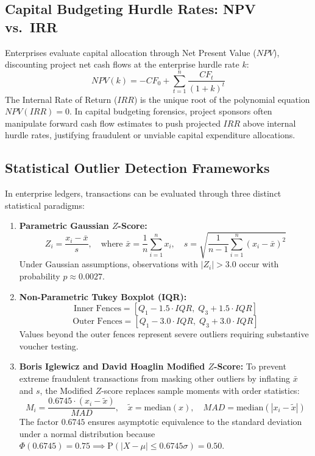 \subsection{Capital Budgeting Hurdle Rates: NPV vs.~IRR}
Enterprises evaluate capital allocation through Net Present Value ($NPV$), discounting project net cash flows at the enterprise hurdle rate $k$:
\begin{equation}
NPV(k) = -CF_0 + \sum_{t=1}^n \frac{CF_t}{(1 + k)^t}
\label{eq:npv_formula}
\end{equation}
The Internal Rate of Return ($IRR$) is the unique root of the polynomial equation $NPV(IRR) = 0$. In capital budgeting forensics, project sponsors often manipulate forward cash flow estimates to push projected $IRR$ above internal hurdle rates, justifying fraudulent or unviable capital expenditure allocations.

\subsection{Statistical Outlier Detection Frameworks}
In enterprise ledgers, transactions can be evaluated through three distinct statistical paradigms:
\begin{enumerate}
    \item \textbf{Parametric Gaussian $Z$-Score:}
    \begin{equation}
    Z_i = \frac{x_i - \bar{x}}{s}, \quad \text{where } \bar{x} = \frac{1}{n} \sum_{i=1}^n x_i, \quad s = \sqrt{\frac{1}{n-1} \sum_{i=1}^n (x_i - \bar{x})^2}
    \label{eq:z_score}
    \end{equation}
    Under Gaussian assumptions, observations with $|Z_i| > 3.0$ occur with probability $p \approx 0.0027$.
    \item \textbf{Non-Parametric Tukey Boxplot (IQR):}
    \begin{equation}
    \text{Inner Fences} = [Q_1 - 1.5 \cdot IQR, \; Q_3 + 1.5 \cdot IQR]
    \label{eq:tukey_iqr}
    \end{equation}
    \begin{equation}
    \text{Outer Fences} = [Q_1 - 3.0 \cdot IQR, \; Q_3 + 3.0 \cdot IQR]
    \end{equation}
    Values beyond the outer fences represent severe outliers requiring substantive voucher testing.
    \item \textbf{Boris Iglewicz and David Hoaglin Modified $Z$-Score:}
    To prevent extreme fraudulent transactions from masking other outliers by inflating $\bar{x}$ and $s$, the Modified $Z$-score replaces sample moments with order statistics:
    \begin{equation}
    M_i = \frac{0.6745 \cdot (x_i - \tilde{x})}{MAD}, \quad \tilde{x} = \text{median}(x), \quad MAD = \text{median}(|x_i - \tilde{x}|)
    \label{eq:modified_z}
    \end{equation}
    The factor $0.6745$ ensures asymptotic equivalence to the standard deviation under a normal distribution because $\Phi(0.6745) = 0.75 \implies \text{P}(|X - \mu| \le 0.6745 \sigma) = 0.50$.
\end{enumerate}

